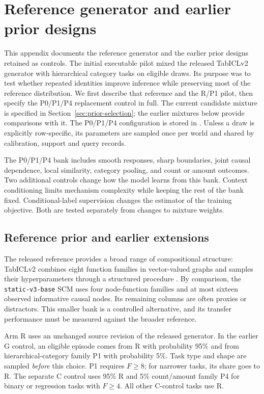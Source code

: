 \documentclass[11pt]{article}
\begin{document}
\clearpage
\appendix

\section{Reference generator and earlier prior designs}
\label{app:reference-priors}
\label{app:staticrecipe}

This appendix documents the reference generator and the earlier prior designs retained as controls. The initial executable pilot mixed the released TabICLv2 generator with hierarchical category tasks on eligible draws. Its purpose was to test whether repeated identities improve inference while preserving most of the reference distribution. We first describe that reference and the R/P1 pilot, then specify the P0/P1/P4 replacement control in full. The current candidate mixture is specified in Section~\ref{sec:prior-selection}; the earlier mixtures below provide comparisons with it. The P0/P1/P4 configuration is stored in . Unless a draw is explicitly row-specific, its parameters are sampled once per world and shared by calibration, support and query records.

The P0/P1/P4 bank includes smooth responses, sharp boundaries, joint causal dependence, local similarity, category pooling, and count or amount outcomes. Two additional controls change how the model learns from this bank. Context conditioning limits mechanism complexity while keeping the rest of the bank fixed. Conditional-label supervision changes the estimator of the training objective. Both are tested separately from changes to mixture weights.

\subsection{Reference prior and earlier extensions}
\label{sec:prior-revision}

The released reference provides a broad range of compositional structure: TabICLv2 combines eight function families in vector-valued graphs and samples their hyperparameters through a structured procedure \cite{tabicl2}. By comparison, the \texttt{static-v3-base} SCM uses four node-function families and at most sixteen observed informative causal nodes. Its remaining columns are often proxies or distractors. This smaller bank is a controlled alternative, and its transfer performance must be measured against the broader reference.

Arm R uses an unchanged source revision of the released generator. In the earlier G control, an eligible episode comes from R with probability 95\% and from hierarchical-category family P1 with probability 5\%. Task type and shape are sampled \emph{before} this choice. P1 requires $F\geq8$; for narrower tasks, its share goes to R. The separate C control uses 95\% R and 5\% count/amount family P4 for binary or regression tasks with $F\geq4$. All other C-control tasks use R.
\end{document}
